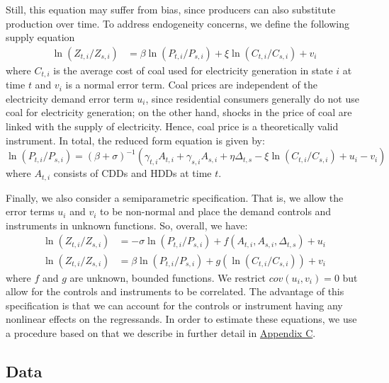 \documentclass[11pt,a4paper]{extarticle}
\begin{document}
Still, this equation may suffer from bias, since producers can also substitute production over time. To address endogeneity concerns, we define the following supply equation
\begin{align*}
\ln (Z_{ t, i} / Z_{ s, i}) &= \beta \ln (P_{t,i} / P_{s,i}) + \xi \ln (C_{t,i} / C_{s,i}) + v_{i}
\end{align*}
where $C_{t,i}$ is the average cost of coal used for electricity generation in state $i$ at time $t$ and $v_i$ is a normal error term. Coal prices are independent of the electricity demand error term $u_i$, since residential consumers generally do not  use coal for electricity generation; on the other hand, shocks in the price of coal are linked with the supply of electricity. Hence, coal price is a theoretically valid instrument.  In total, the reduced form equation is given by:
\begin{equation}
 \ln (P_{t,i} / P_{s,i}) = \left( \beta + \sigma \right)^{-1} \left( \gamma_{t,i} A_{t,i} + \gamma_{s,i} A_{s,i} + \eta \Delta_{t,s} - \xi \ln (C_{t,i} / C_{s,i}) + u_{i} - v_i \right)  
 \end{equation}
where $A_{t,i}$ consists of CDDs and HDDs at time $t$. 

Finally, we also consider a semiparametric specification. That is, we allow the error terms $u_i$ and $v_i$ to be non-normal and place the demand controls and instruments in unknown functions. So, overall, we have:
\begin{align}
\ln (Z_{ t, i} / Z_{ s, i}) &= -\sigma \ln (P_{t,i} / P_{s,i}) +  f \left( A_{t,i}, A_{s,i}, \Delta_{t,s} \right) + u_i \\
\ln (Z_{ t, i} / Z_{ s, i}) &= \beta \ln (P_{t,i} / P_{s,i}) + g \left( \ln (C_{t,i} / C_{s,i})  \right) + v_{i}
\end{align}
where $f$ and $g$ are unknown, bounded functions. We restrict $cov(u_i, v_i) = 0$ but allow for the controls and instruments to be correlated. The advantage of this specification is that we can account for the controls or instrument having any nonlinear effects on the regressands. In order to estimate these equations, we use a procedure based on \citet{Newey} that we describe in further detail in \hyperref[sec:AppendixC]{Appendix C}.  \noindent

\noindent
\subsection{Data}
\end{document}
